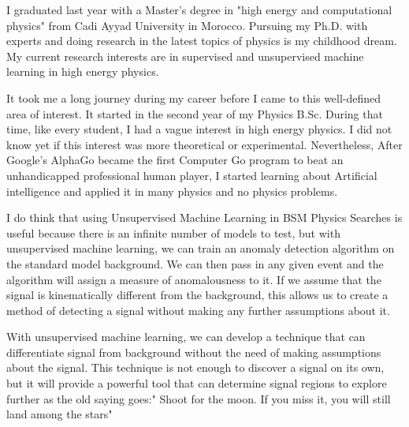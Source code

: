 \documentclass[12pt, a4paper]{awesome-cv}
\begin{document}


\makelettertitle

\begin{cvletter}

I graduated last year with a Master's degree in "high energy and computational physics" from Cadi Ayyad University in Morocco. Pursuing my Ph.D. with experts and doing research in the latest topics of physics is my childhood dream.
My current research interests are in supervised and unsupervised machine learning in high energy physics.

It took me a long journey during my career before I came to this well-defined area of interest. It started in the second year of my Physics B.Sc. During that time, like every student, I had a vague interest in high energy physics. I did not know yet if this interest was more theoretical or experimental. Nevertheless, After Google's AlphaGo became the first Computer Go program to beat an unhandicapped professional human player, I started learning about Artificial intelligence and applied it in many physics and no physics problems.

I do think that using Unsupervised Machine Learning in BSM Physics Searches is useful because there is an infinite number of models to test, but with unsupervised machine learning, we can train an anomaly detection algorithm on the standard model background. We can then pass in any given event and the algorithm will assign a measure of anomalousness to it. If we assume that the signal is kinematically different from the background, this allows us to create a method of detecting a signal without making any further assumptions about it.

With unsupervised machine learning, we can develop a technique that can differentiate signal from background without the need of making assumptions about the signal. This technique is not enough to discover a signal on its own, but it will provide a powerful tool that can determine signal regions to explore further as the old saying goes:" Shoot for the moon. If you miss it, you will still land among the stars"


\end{cvletter}
\end{document}
